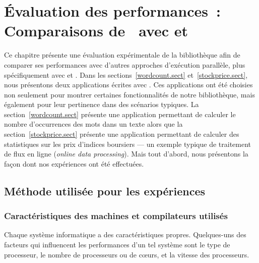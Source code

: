 
\chapter{Évaluation des performances~: Comparaisons de \ppff\ avec  et }
\label{experiences.chap}

Ce chapitre pr\'esente une \'evaluation exp\'erimentale de la biblioth\`eque  afin de comparer ses performances avec d'autres approches d'ex\'ecution parall\`ele, plus sp\'ecifiquement avec  et .
%
Dans les sections~\ref{wordcount.sect} et~\ref{stockprice.sect}, nous pr\'esentons deux applications \'ecrites avec \PpFf. Ces applications ont \'et\'e choisies non seulement pour montrer certaines fonctionnalit\'es de notre biblioth\`eque, mais \'egalement pour leur pertinence dans des sc\'enarios typiques. La section~\ref{wordcount.sect} pr\'esente une application permettant de calculer le nombre d'occurrences des mots dans un texte %
%
alors que la section~\ref{stockprice.sect} pr\'esente une application permettant de calculer des statistiques sur les prix d'indices boursiers --- un exemple typique de traitement de flux en ligne (\emph{online data processing}). Mais tout d'abord, nous pr\'esentons la fa\c{c}on dont nos exp\'eriences ont \'et\'e effectu\'ees.




\section{M\'ethode utilis\'ee pour les exp\'eriences}
\label{usedMethodsForBenchmarks.chap}

\subsection{Caractéristiques des machines et compilateurs utilisés}

Chaque syst\`eme informatique a des caract\'eristiques propres. Quelques-uns des facteurs qui influencent les performances d'un tel syst\`eme sont le type de processeur, le nombre de processeurs ou de c\oe{}urs, et la vitesse des processeurs. 


